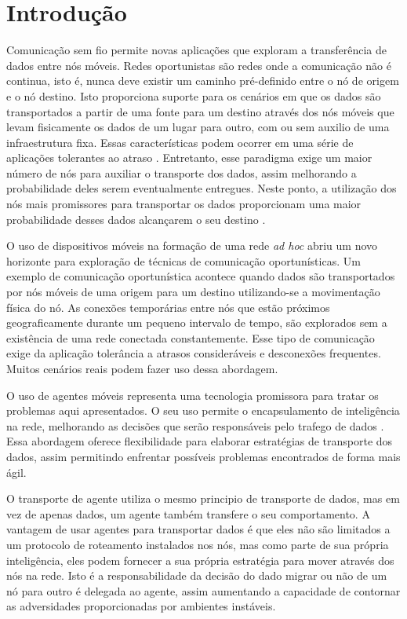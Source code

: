 \section{Introdução}

Comunicação sem fio permite novas aplicações que exploram a transferência de dados entre nós móveis. Redes oportunistas são redes onde a comunicação não é continua, isto é, nunca deve existir um caminho pré-definido entre o nó de origem e o nó destino. Isto proporciona suporte para os cenários em que os dados são transportados a partir de uma fonte para um destino através dos nós móveis que levam fisicamente os dados de um lugar para outro, com ou sem auxilio de uma infraestrutura fixa. Essas características podem ocorrer em uma série de aplicações tolerantes ao atraso \cite{Fall:2003}. Entretanto, esse paradigma exige um maior número de nós para auxiliar o transporte dos dados, assim melhorando a probabilidade deles serem eventualmente entregues. Neste ponto, a utilização dos nós mais promissores para transportar os dados proporcionam uma maior probabilidade desses dados alcançarem o seu destino \cite{Freitas:2013}.

O uso de dispositivos móveis na formação de uma rede \emph{ad hoc} abriu um novo horizonte para exploração de técnicas de comunicação oportunísticas. Um exemplo de comunicação oportunística acontece quando dados são transportados por nós móveis de uma origem para um destino utilizando-se a movimentação física do nó. As conexões temporárias entre nós que estão próximos geograficamente durante um pequeno intervalo de tempo, são explorados sem a existência de uma rede conectada constantemente. Esse tipo de comunicação exige da aplicação tolerância a atrasos consideráveis e desconexões frequentes. Muitos cenários reais podem fazer uso dessa abordagem.

O uso de agentes móveis representa uma tecnologia promissora \cite{Urra:2010} para tratar os problemas aqui apresentados. O seu uso permite o encapsulamento de inteligência na rede, melhorando as decisões que serão responsáveis pelo trafego de dados \cite{Freitas:2010}. Essa abordagem oferece flexibilidade para elaborar estratégias de transporte dos dados, assim permitindo enfrentar possíveis problemas encontrados de forma mais ágil. 

O transporte de agente utiliza o mesmo principio de transporte de dados, mas em vez de apenas dados, um agente também transfere o seu comportamento. A vantagem de usar agentes para transportar dados é que eles não são limitados a um protocolo de roteamento instalados nos nós, mas como parte de sua própria inteligência, eles podem fornecer a sua própria estratégia para mover através dos nós na rede. Isto é a responsabilidade da decisão do dado migrar ou não de um nó para outro é delegada ao agente, assim aumentando a capacidade de contornar as adversidades proporcionadas por ambientes instáveis.

